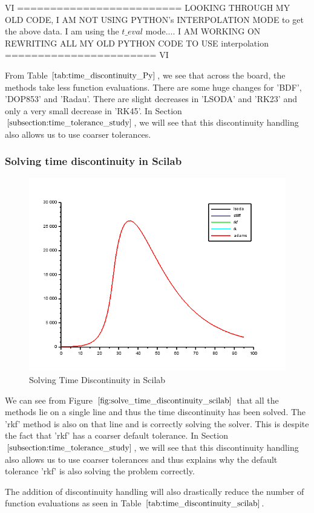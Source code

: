 VI =========================
LOOKING THROUGH MY OLD CODE, I AM NOT USING PYTHON's INTERPOLATION MODE to get the above data. I am using the $t\_eval$ mode.... 
I AM WORKING ON REWRITING ALL MY OLD PYTHON CODE TO USE interpolation
======================= VI

From Table $\ref{tab:time_discontinuity_Py}$, we see that across the board, the methods take less function evaluations. There are some huge changes for 'BDF', 'DOP853' and 'Radau'. There are slight decreases in 'LSODA' and 'RK23' and only a very small decrease in 'RK45'. In Section $\ref{subsection:time_tolerance_study}$, we will see that this discontinuity handling also allows us to use coarser tolerances.

\subsubsection{Solving time discontinuity in Scilab} 
\begin{figure}[h]
	\centering
	\includegraphics[width=0.7\linewidth]{./figures/solve_time_discontinuity_scilab}
	\caption{Solving Time Discontinuity in Scilab}
	\label{fig:solve_time_discontinuity_scilab}
\end{figure}
We can see from Figure $\ref{fig:solve_time_discontinuity_scilab}$ that all the methods lie on a single line and thus the time discontinuity has been solved. The 'rkf' method is also on that line and is correctly solving the solver. This is despite the fact that 'rkf' has a coarser default tolerance. In Section $\ref{subsection:time_tolerance_study}$, we will see that this discontinuity handling also allows us to use coarser tolerances and thus explains why the default tolerance 'rkf' is also solving the problem correctly.

The addition of discontinuity handling will also drastically reduce the number of function evaluations as seen in Table $\ref{tab:time_discontinuity_scilab}$.


